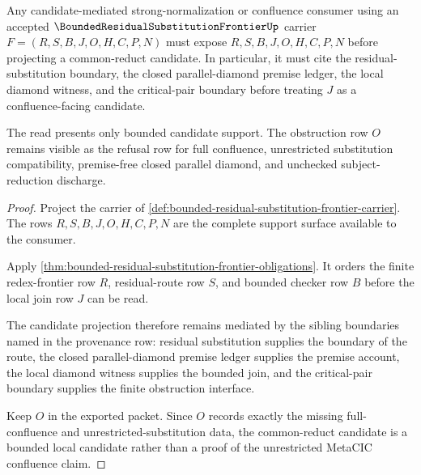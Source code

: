 \begin{theorem}
\label{thm:metacic-residual-substitution-candidate-support}
Any candidate-mediated strong-normalization or confluence consumer using an accepted $\BoundedResidualSubstitutionFrontierUp$ carrier $F=(R,S,B,J,O,H,C,P,N)$ must expose $R,S,B,J,O,H,C,P,N$ before projecting a common-reduct candidate. In particular, it must cite the residual-substitution boundary, the closed parallel-diamond premise ledger, the local diamond witness, and the critical-pair boundary before treating $J$ as a confluence-facing candidate.

The read presents only bounded candidate support. The obstruction row $O$ remains visible as the refusal row for full confluence, unrestricted substitution compatibility, premise-free closed parallel diamond, and unchecked subject-reduction discharge.
\end{theorem}
\begin{proof}
Project the carrier of \autoref{def:bounded-residual-substitution-frontier-carrier}. The rows $R,S,B,J,O,H,C,P,N$ are the complete support surface available to the consumer.

Apply \autoref{thm:bounded-residual-substitution-frontier-obligations}. It orders the finite redex-frontier row $R$, residual-route row $S$, and bounded checker row $B$ before the local join row $J$ can be read.

The candidate projection therefore remains mediated by the sibling boundaries named in the provenance row: residual substitution supplies the boundary of the route, the closed parallel-diamond premise ledger supplies the premise account, the local diamond witness supplies the bounded join, and the critical-pair boundary supplies the finite obstruction interface.

Keep $O$ in the exported packet. Since $O$ records exactly the missing full-confluence and unrestricted-substitution data, the common-reduct candidate is a bounded local candidate rather than a proof of the unrestricted MetaCIC confluence claim.
\end{proof}



